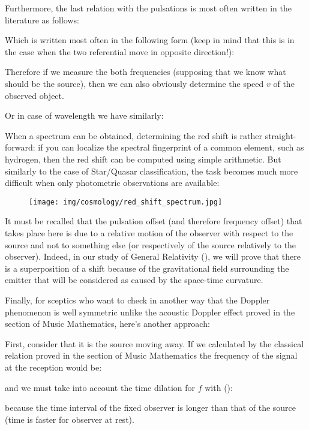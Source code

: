 	Furthermore, the last relation with the pulsations is most often written in the literature as follows:
	
	Which is written most often in the following form (keep in mind that this is in the case when the two referential move in opposite direction!):
	
	Therefore if we measure the both frequencies (supposing that we know what should be the source), then we can also obviously determine the speed $v$ of the observed object.
	
	Or in case of wavelength we have similarly:
	
	
	When a spectrum can be obtained, determining the red shift is rather straight-forward: if you can localize the spectral fingerprint of a common element, such as hydrogen, then the red shift can be computed using simple arithmetic. But similarly to the case of Star/Quasar classification, the task becomes much more difficult when only photometric observations are available:
	\begin{figure}[H]
		\centering
		\texttt{[image: img/cosmology/red\_shift\_spectrum.jpg]}
	\end{figure}
	It must be recalled that the pulsation offset (and therefore frequency offset) that takes place here is due to a relative motion of the observer with respect to the source and not to something else (or respectively of the source relatively to the observer). Indeed, in our study of General Relativity (), we will prove that there is a superposition of a shift because of the gravitational field surrounding the emitter that will be considered as caused by the space-time curvature.

	Finally, for sceptics who want to check in another way that the Doppler phenomenon is well symmetric unlike the acoustic Doppler effect proved in the section of Music Mathematics, here's another approach:

	First, consider that it is the source moving away. If we calculated by the classical relation proved in the section of Music Mathematics the frequency of the signal at the reception would be:
	
	and we must take into account the time dilation for $f$ with ():
	
	because the time interval of the fixed observer is longer than that of the source (time is faster for observer at rest).

